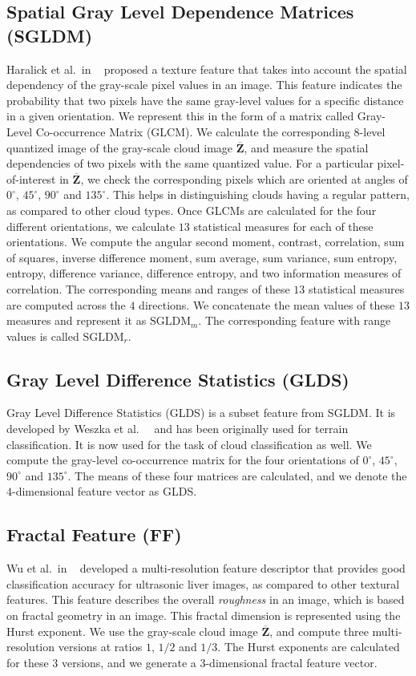 \subsection{Spatial Gray Level Dependence Matrices (SGLDM)}
Haralick et al.\ in ~\cite{Haralick73} proposed a texture feature that takes into account the spatial dependency of the gray-scale pixel values in an image. This feature indicates the probability that two pixels have the same gray-level values for a specific distance in a given orientation. We represent this in the form of a matrix called Gray-Level Co-occurrence Matrix (GLCM). We calculate the corresponding $8$-level quantized image of the gray-scale cloud image $\overline{\mathbf{Z}}$, and measure the spatial dependencies of two pixels with the same quantized value. For a particular pixel-of-interest in $\overline{\mathbf{Z}}$, we check the corresponding pixels which are oriented at angles of $0^{\circ}$, $45^{\circ}$, $90^{\circ}$ and $135^{\circ}$. This helps in distinguishing clouds having a regular pattern, as compared to other cloud types. Once GLCMs are calculated for the four different orientations, we calculate $13$ statistical measures for each of these orientations. We compute the angular second moment, contrast, correlation, sum of squares, inverse difference moment, sum average, sum variance, sum entropy, entropy, difference variance, difference entropy, and two information measures of correlation. The corresponding means and ranges of these $13$ statistical measures are computed across the $4$ directions. We concatenate the mean values of these $13$ measures and represent it as $\mbox{SGLDM}_m$. The corresponding feature with range values is called $\mbox{SGLDM}_r$.

\subsection{Gray Level Difference Statistics (GLDS)}
Gray Level Difference Statistics (GLDS) is a subset feature from SGLDM. It is developed by Weszka et al.\ ~\cite{Weszka76} and has been originally used for terrain classification. It is now used for the task of cloud classification as well. We compute the gray-level co-occurrence matrix for the four orientations of $0^{\circ}$, $45^{\circ}$, $90^{\circ}$ and $135^{\circ}$. The means of these four matrices are calculated, and we denote the $4$-dimensional feature vector as GLDS.

\subsection{Fractal Feature (FF)}
Wu et al.\ in ~\cite{Wu92} developed a multi-resolution feature descriptor that provides good classification accuracy for ultrasonic liver images, as compared to other textural features. This feature describes the overall \emph{roughness} in an image, which is based on fractal geometry in an image. This fractal dimension is represented using the Hurst exponent. We use the gray-scale cloud image $\overline{\mathbf{Z}}$, and compute three multi-resolution versions at ratios $1$, $1/2$ and $1/3$. The Hurst exponents are calculated for these $3$ versions, and we generate a $3$-dimensional fractal feature vector. 

